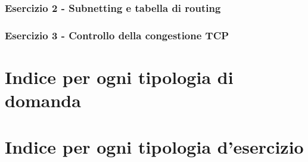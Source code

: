 \documentclass[a4paper]{article}
\begin{document}
	\subsubsection{Esercizio 2 - Subnetting e tabella di routing}
	
	\subsubsection{Esercizio 3 - Controllo della congestione TCP}
	
	\newpage

	\section{Indice per ogni tipologia di domanda}

	\section{Indice per ogni tipologia d'esercizio}
\end{document}
